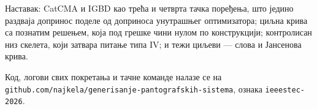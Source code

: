 \documentclass[
  conference,
  a4paper,
  10pt]{IEEEtran}
\begin{document}
Наставак: CatCMA и IGBD као трећа и четврта тачка поређења, што једино
раздваја допринос поделе од доприноса унутрашњег оптимизатора; циљна
крива са познатим решењем, која под грешке чини нулом по конструкцији;
контролисан низ скелета, који затвара питање типа IV; и тежи циљеви ---
слова и Јансенова крива.

Код, логови свих покретања и тачне команде налазе се на
\texttt{github.com/najkela/generisanje-pantografskih-sistema}, ознака
\texttt{ieeestec-2026}.

  \footnotesize
\end{document}
